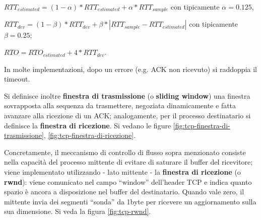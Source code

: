 \documentclass[11pt, italian, openany]{book}
\begin{document}
\begin{sloppypar}
\begin{itemize}[topsep=0pt, itemsep=0pt, parsep=0pt]
\begin{itemize}[topsep=0pt, itemsep=0pt, parsep=0pt]
		\( RTT_{estimated} =  (1 - \alpha) * RTT_{estimated} + \alpha * RTT_{sample} \) con tipicamente \( \alpha = 0.125\),

		\(RTT_{dev} = (1 - \beta) * RTT_{dev} + \beta * | RTT_{sample} - RTT_{estimated} | \) con tipicamente \( \beta = 0.25 \);

		\( RTO = RTO_{estimated} + 4 * RTT_{dev}\).

		In molte implementazioni, dopo un errore (e.g. ACK non ricevuto) si raddoppia il timeout.

		Si definisce inoltre \textbf{finestra di trasmissione} (o \textbf{sliding window}) una finestra sovrapposta alla sequenza da trasmettere, negoziata
		dinamicamente e fatta avanzare alla ricezione di un ACK; analogamente, per il processo destinatario si definisce la \textbf{finestra di ricezione}.
		Si vedano le figure \ref{fig:tcp-finestra-di-trasmissione}, \ref{fig:tcp-finestra-di-ricezione}.

		Concretamente, il meccanismo di controllo di flusso sopra menzionato consiste nella capacit\`a del processo mittente di evitare di saturare il buffer
		del ricevitore; viene implementato utilizzando - lato mittente - la \textbf{finestra di ricezione} (o \textbf{rwnd}): viene comunicato nel campo
		``window'' dell'header TCP e indica quanto spazio \`e ancora a disposizione nel buffer del destinatario. Quando vale zero, il mittente invia dei
		segmenti ``sonda'' da 1byte per ricevere un aggiornamento sulla sua dimensione. Si veda la figura \ref{fig:tcp-rwnd}.


\end{itemize}
\end{itemize}
\end{sloppypar}
\end{document}
